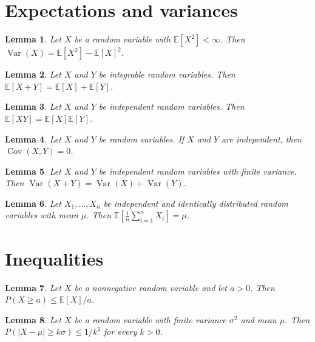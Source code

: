 \documentclass{article}
\newtheorem{lemma}{Lemma}
\begin{document}
\section{Expectations and variances}

\begin{lemma}\label{variance}
Let $X$ be a random variable with $\mathbb{E}[X^2]<\infty$. Then $\operatorname{Var}(X)=\mathbb{E}[X^2]-\mathbb{E}[X]^2$.
\end{lemma}

\begin{lemma}\label{linearity}
Let $X$ and $Y$ be integrable random variables. Then $\mathbb{E}[X+Y]=\mathbb{E}[X]+\mathbb{E}[Y]$.
\end{lemma}

\begin{lemma}\label{product}
Let $X$ and $Y$ be independent random variables. Then $\mathbb{E}[XY]=\mathbb{E}[X]\mathbb{E}[Y]$.
\end{lemma}

\begin{lemma}\label{covariance}
Let $X$ and $Y$ be random variables. If $X$ and $Y$ are independent, then $\operatorname{Cov}(X,Y)=0$.
\end{lemma}

\begin{lemma}\label{variance-sum}
Let $X$ and $Y$ be independent random variables with finite variance. Then $\operatorname{Var}(X+Y)=\operatorname{Var}(X)+\operatorname{Var}(Y)$.
\end{lemma}

\begin{lemma}\label{sample-mean}
Let $X_1,\dots,X_n$ be independent and identically distributed random variables with mean $\mu$. Then $\mathbb{E}[\frac{1}{n}\sum_{i=1}^n X_i]=\mu$.
\end{lemma}

\section{Inequalities}

\begin{lemma}\label{markov}
Let $X$ be a nonnegative random variable and let $a>0$. Then $P(X\ge a)\le \mathbb{E}[X]/a$.
\end{lemma}

\begin{lemma}\label{chebyshev}
Let $X$ be a random variable with finite variance $\sigma^2$ and mean $\mu$. Then $P(|X-\mu|\ge k\sigma)\le 1/k^2$ for every $k>0$.
\end{lemma}
\end{document}
